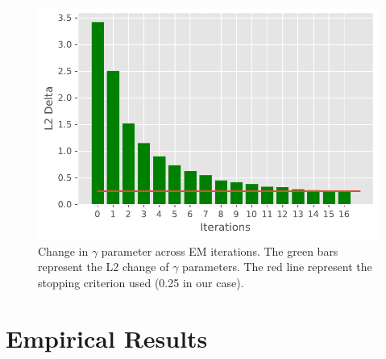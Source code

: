 \documentclass[11pt]{article}
\begin{document}
\begin{figure}[ht]
\vskip 0.2in
\begin{center}
\centerline{\includegraphics[width=\columnwidth]{plot_delta_gamma_convergence}}
\caption{Change in $\gamma$ parameter across EM iterations. The green bars represent the L2 change of  $\gamma$ parameters. The red line represent the stopping criterion  used (0.25 in our case).}
\label{icml-historical}
\end{center}
\vskip -0.2in
\end{figure}

\section{Empirical Results}
\end{document}
